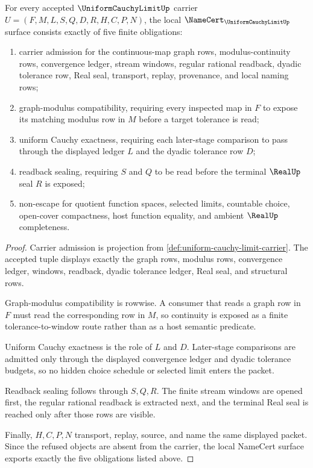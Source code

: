 \begin{theorem}
\label{thm:uniform-cauchy-limit-namecert-obligations}
For every accepted $\UniformCauchyLimitUp$ carrier $U=(F,M,L,S,Q,D,R,H,C,P,N)$, the local $\NameCert_{\UniformCauchyLimitUp}$ surface consists exactly of five finite obligations:
\begin{enumerate}
\item carrier admission for the continuous-map graph rows, modulus-continuity rows, convergence ledger, stream windows, regular rational readback, dyadic tolerance row, Real seal, transport, replay, provenance, and local naming rows;
\item graph-modulus compatibility, requiring every inspected map in $F$ to expose its matching modulus row in $M$ before a target tolerance is read;
\item uniform Cauchy exactness, requiring each later-stage comparison to pass through the displayed ledger $L$ and the dyadic tolerance row $D$;
\item readback sealing, requiring $S$ and $Q$ to be read before the terminal $\RealUp$ seal $R$ is exposed;
\item non-escape for quotient function spaces, selected limits, countable choice, open-cover compactness, host function equality, and ambient $\RealUp$ completeness.
\end{enumerate}
\end{theorem}
\begin{proof}
Carrier admission is projection from \autoref{def:uniform-cauchy-limit-carrier}. The accepted tuple displays exactly the graph rows, modulus rows, convergence ledger, windows, readback, dyadic tolerance ledger, Real seal, and structural rows.

Graph-modulus compatibility is rowwise. A consumer that reads a graph row in $F$ must read the corresponding row in $M$, so continuity is exposed as a finite tolerance-to-window route rather than as a host semantic predicate.

Uniform Cauchy exactness is the role of $L$ and $D$. Later-stage comparisons are admitted only through the displayed convergence ledger and dyadic tolerance budgets, so no hidden choice schedule or selected limit enters the packet.

Readback sealing follows through $S,Q,R$. The finite stream windows are opened first, the regular rational readback is extracted next, and the terminal Real seal is reached only after those rows are visible.

Finally, $H,C,P,N$ transport, replay, source, and name the same displayed packet. Since the refused objects are absent from the carrier, the local NameCert surface exports exactly the five obligations listed above.
\end{proof}

